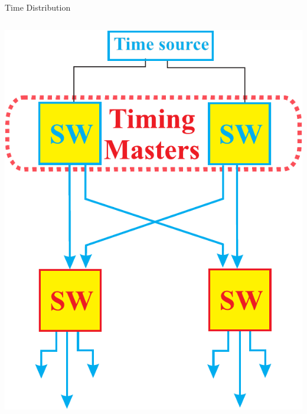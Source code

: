 \documentclass[compress,red]{beamer}
\begin{document}
\begin{frame}{Time Distribution}
\begin{columns}[c]
      \begin{center}
	\includegraphics[width=1.1\textwidth]{robustness/WRPTPmodif_0.pdf}
      \end{center}  
    

  \end{columns}

\end{frame}
\end{document}
